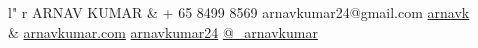 \documentclass[11pt, letter]{article}
\begin{document}
%
\begin{adjustbox}{width=1.03\textwidth,center}
\begin{tabular}{ l" r }
  {
    {\titlefont\fontsize{35pt}{22pt}\selectfont
      ARNAV KUMAR
    }
  }
&
\faMobilePhone {} + 65 8499 8569 \textbullet{}
\faEnvelope {} arnavkumar24@gmail.com \textbullet{}
\faGithubSign{ }\href{https://github.com/arnavk}{arnavk}
\\
&
\faExternalLink{ }\href{http://arnavkumar.com}{arnavkumar.com} \textbullet{}
\faLinkedinSign{ }\href{http://sg.linkedin.com/in/arnavkumar24/}{arnavkumar24} \textbullet{}
\faTwitterSign{ }\href{http://twitter.com/\_arnavkumar}{@\_arnavkumar}
\\
\end{tabular}
\end{adjustbox}

\begin{raggedright}
\vspace{5mm}


\end{raggedright}
\end{document}
